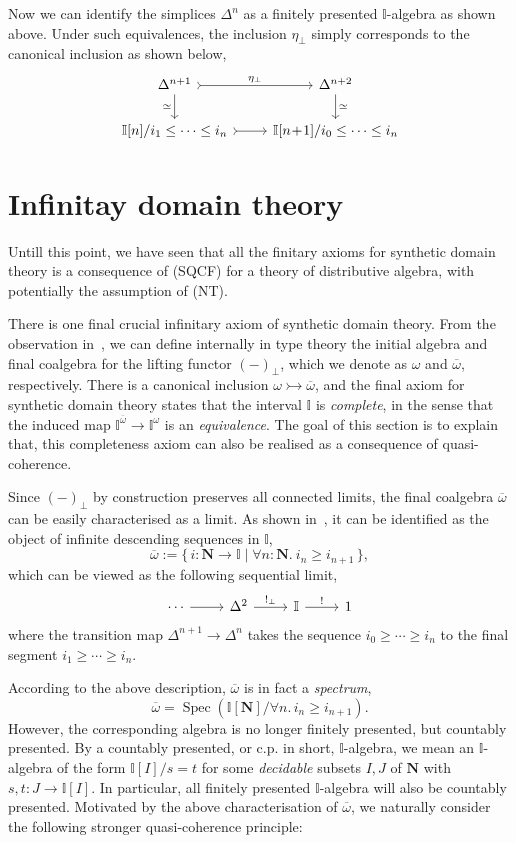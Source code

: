 \documentclass[12pt]{amsart}
\theoremstyle{definition}
\newcommand{\mb}[1]{\mathbf{#1}}
\newcommand{\mbb}[1]{\mathbb{#1}}
\newcommand{\I}{\mbb I}
\newcommand{\ov}[1]{\overline{#1}}
\newcommand{\scomp}[2]{\{\,#1\mid#2\,\}}
\newcommand{\inj}{\rightarrowtail}
\newcommand{\N}{\mb N}
\newcommand{\prt}{_{\bot}}
\newcommand{\fa}[2]{\forall #1\!\colon\!\!#2.\ }
\newcommand{\spec}{\operatorname{Spec}}
\begin{document}
Now we can identify the simplices $\Delta^n$ as a finitely presented $\I$-algebra as shown above. Under such equivalences, the inclusion $\eta\prt$ simply corresponds to the canonical inclusion as shown below,
\[
  \begin{tikzcd}
    \Delta^{n+1} \ar[r, tail, "\eta\prt"] \ar[d, "\simeq"'] & \Delta^{n+2}  \ar[d, "\simeq"] \\ 
    \I[n]/i_1 \le \cdots \le i_n \ar[r, tail] & \I[n\!+\!1]/i_0 \le \cdots \le i_{n} 
  \end{tikzcd}
\]

\section{Infinitay domain theory}\label{sec:infdomain}

Untill this point, we have seen that all the finitary axioms for synthetic domain theory is a consequence of (SQCF) for a theory of distributive algebra, with potentially the assumption of (NT).

There is one final crucial infinitary axiom of synthetic domain theory. From the observation in~\cite{hyland2006first,JIBLADZE1997185}, we can define internally in type theory the initial algebra and final coalgebra for the lifting functor $(-)\prt$, which we denote as $\omega$ and $\ov\omega$, respectively. There is a canonical inclusion $\omega \inj \ov\omega$, and the final axiom for synthetic domain theory states that the interval $\I$ is \emph{complete}, in the sense that the induced map $\I^{\ov\omega} \to \I^\omega$ is an \emph{equivalence}. The goal of this section is to explain that, this completeness axiom can also be realised as a consequence of quasi-coherence.

Since $(-)\prt$ by construction preserves all connected limits, the final coalgebra $\ov\omega$ can be easily characterised as a limit. As shown in~\cite{hyland2006first}, it can be identified as the object of infinite descending sequences in $\I$,
\[ \ov\omega := \scomp{i : \N \to \I}{\fa n\N i_n \ge i_{n+1}}, \]
which can be viewed as the following sequential limit,
\[
\begin{tikzcd}
  \cdots \ar[r] & \Delta^2 \ar[r, "!\prt"] & \I \ar[r, "!"] & 1
\end{tikzcd}
\]
where the transition map $\Delta^{n+1} \to \Delta^n$ takes the sequence $i_0 \ge \cdots \ge i_n$ to the final segment $i_1 \ge \cdots \ge i_n$. 

According to the above description, $\ov\omega$ is in fact a \emph{spectrum},
\[ \ov\omega = \spec(\I[\N]/\forall n.\, i_n \ge i_{n+1}). \]
However, the corresponding algebra is no longer finitely presented, but countably presented. By a countably presented, or c.p. in short, $\I$-algebra, we mean an $\I$-algebra of the form $\I[I]/s=t$ for some \emph{decidable} subsets $I,J$ of $\N$ with $s,t : J \to \I[I]$. In particular, all finitely presented $\I$-algebra will also be countably presented. Motivated by the above characterisation of $\ov\omega$, we naturally consider the following stronger quasi-coherence principle:
\end{document}
